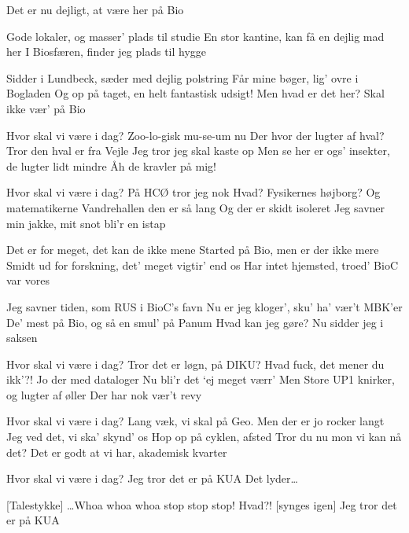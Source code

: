 \documentclass[a4paper,11pt]{article}
\begin{document}
\begin{song}
 Det er nu dejligt, at være her på Bio

 Gode lokaler, og masser’ plads til studie
 En stor kantine, kan få en dejlig mad her
 I Biosfæren, finder jeg plads til hygge

 Sidder i Lundbeck, sæder med dejlig polstring
 Får mine bøger, lig’ ovre i Bogladen
 Og op på taget, en helt fantastisk udsigt!
 Men hvad er det her? Skal ikke vær’ på Bio

 Hvor skal vi være i dag?
 Zoo-lo-gisk mu-se-um nu
 Der hvor der lugter af hval?
 Tror den hval er fra Vejle
 Jeg tror jeg skal kaste op
 Men se her er ogs’ insekter, de lugter lidt mindre
 Åh de kravler på mig!

 Hvor skal vi være i dag?
 På HCØ tror jeg nok
 Hvad? Fysikernes højborg?
 Og matematikerne
 Vandrehallen den er så lang
 Og der er skidt isoleret
 Jeg savner min jakke, mit snot bli’r en istap

Det er for meget, det kan de ikke mene
Started på Bio, men er der ikke mere
Smidt ud for forskning, det’ meget vigtir' end os
Har intet hjemsted, troed’ BioC var vores

Jeg savner tiden, som RUS i BioC’s favn
Nu er jeg kloger’, sku’ ha’ vær’t MBK’er
De’ mest på Bio, og så en smul’ på Panum
Hvad kan jeg gøre? Nu sidder jeg i saksen



 Hvor skal vi være i dag?
 Tror det er løgn, på DIKU?
 Hvad fuck, det mener du ikk’?!
 Jo der med dataloger
 Nu bli’r det ‘ej meget værr’
 Men Store UP1 knirker, og lugter af øller
 Der har nok vær’t revy

 Hvor skal vi være i dag?
 Lang væk, vi skal på Geo.
 Men der er jo rocker langt
 Jeg ved det, vi ska’ skynd’ os
 Hop op på cyklen, afsted
 Tror du nu mon vi kan nå det?
 Det er godt at vi har, akademisk kvarter

 Hvor skal vi være i dag?
 Jeg tror det er på KUA
 Det lyder\ldots

[Talestykke] \ldots Whoa whoa whoa stop stop stop! Hvad?!
[synges igen] Jeg tror det er på KUA


\end{song}
\end{document}
